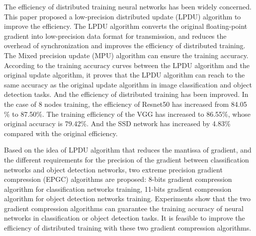 \begin{eabstract}

The efficiency of distributed training neural networks has been widely concerned. This paper proposed a low-precision distributed update (LPDU) algorithm to improve the efficiency. The LPDU algorithm converts the original floating-point gradient into low-precision data format for transmission, and reduces the overhead of synchronization and improves the efficiency of distributed training. The Mixed precision update (MPU) algorithm can ensure the training accuracy. According to the training accuracy curves between the LPDU algorithm and the original update algorithm, it proves that the LPDU algorithm can reach to the same accuracy as the original update algorithm in image classification and object detection tasks. And the efficiency of distributed training has been improved. In the case of 8 nodes training, the efficiency of Resnet50 has increased from 84.05 \% to 87.50\%. The training efficiency of the VGG has increased to 86.55\%, whose original accuracy is 79.42\%. And the SSD network has increased by 4.83\% compared with the original efficiency.

Based on the idea of LPDU algorithm that reduces the mantissa of gradient, and the different requirements for the precision of the gradient between classification networks and object detection networks, two extreme precision gradient compression (EPGC) algorithms are proposed: 8-bits gradient compression algorithm for classification networks training, 11-bits gradient compression algorithm for object detection networks training. Experiments show that the two gradient compression algorithms can guarantee the training accuracy of neural networks in classification or object detection tasks. It is feasible to improve the efficiency of distributed training with these two gradient compression algorithms.

\end{eabstract}


